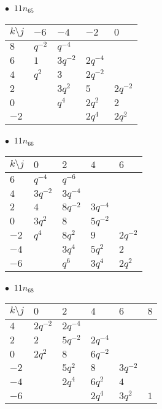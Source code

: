 %
\begin{minipage}{\linewidth}
$\bullet\ $ $11n_{65}$ \vspace{0.5em} \\
\begin{tabular}{l|llll}
$k \setminus j$ & $-6$ & $-4$ & $-2$ & $0$ \\
\hline
$8$ & $q^{-2}$ & $q^{-4}$ &  &  \\
$6$ & $1$ & $3q^{-2}$ & $2q^{-4}$ &  \\
$4$ & $q^{2}$ & $3$ & $2q^{-2}$ &  \\
$2$ &  & $3q^{2}$ & $5$ & $2q^{-2}$ \\
$0$ &  & $q^{4}$ & $2q^{2}$ & $2$ \\
$-2$ &  &  & $2q^{4}$ & $2q^{2}$ \\
\end{tabular}
\vspace{2em}
\end{minipage}
%
\begin{minipage}{\linewidth}
$\bullet\ $ $11n_{66}$ \vspace{0.5em} \\
\begin{tabular}{l|llll}
$k \setminus j$ & $0$ & $2$ & $4$ & $6$ \\
\hline
$6$ & $q^{-4}$ & $q^{-6}$ &  &  \\
$4$ & $3q^{-2}$ & $3q^{-4}$ &  &  \\
$2$ & $4$ & $8q^{-2}$ & $3q^{-4}$ &  \\
$0$ & $3q^{2}$ & $8$ & $5q^{-2}$ &  \\
$-2$ & $q^{4}$ & $8q^{2}$ & $9$ & $2q^{-2}$ \\
$-4$ &  & $3q^{4}$ & $5q^{2}$ & $2$ \\
$-6$ &  & $q^{6}$ & $3q^{4}$ & $2q^{2}$ \\
\end{tabular}
\vspace{2em}
\end{minipage}
%
\begin{minipage}{\linewidth}
$\bullet\ $ $11n_{68}$ \vspace{0.5em} \\
\begin{tabular}{l|lllll}
$k \setminus j$ & $0$ & $2$ & $4$ & $6$ & $8$ \\
\hline
$4$ & $2q^{-2}$ & $2q^{-4}$ &  &  &  \\
$2$ & $2$ & $5q^{-2}$ & $2q^{-4}$ &  &  \\
$0$ & $2q^{2}$ & $8$ & $6q^{-2}$ &  &  \\
$-2$ &  & $5q^{2}$ & $8$ & $3q^{-2}$ &  \\
$-4$ &  & $2q^{4}$ & $6q^{2}$ & $4$ &  \\
$-6$ &  &  & $2q^{4}$ & $3q^{2}$ & $1$ \\
\end{tabular}
\vspace{2em}
\end{minipage}
